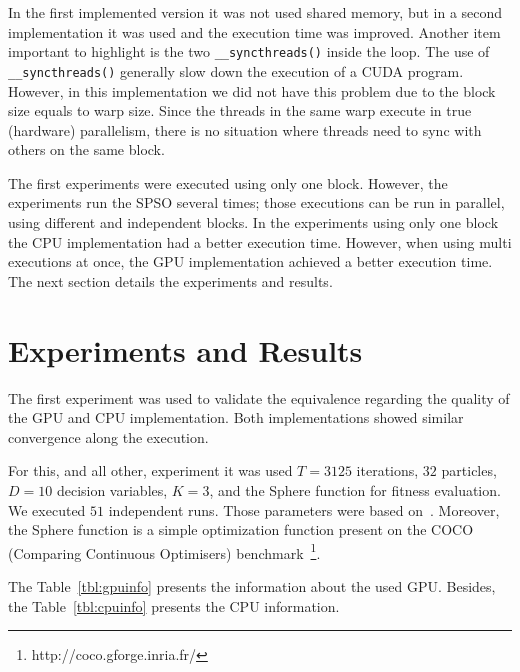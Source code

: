 \documentclass{article}
\begin{document}
    In the first implemented version it was not used shared memory, but in a second implementation it was used and the execution time was improved.
    Another item important to highlight is the two \texttt{\_\_syncthreads()} inside the loop.
    The use of \texttt{\_\_syncthreads()} generally slow down the execution of a CUDA program.
    However, in this implementation we did not have this problem due to the block size equals to warp size.
    Since the threads in the same warp execute in true (hardware) parallelism, there is no situation where threads need to sync with others on the same block.

    The first experiments were executed using only one block. However, the experiments run the SPSO several times; those executions can be run in parallel, using different and independent blocks. In the experiments using only one block the CPU implementation had a better execution time. However, when using multi executions at once, the GPU implementation achieved a better execution time.
    The next section details the experiments and results.

    \section{Experiments and Results}

    The first experiment was used to validate the equivalence regarding the quality of the GPU and CPU implementation. Both implementations showed similar convergence along the execution.

    For this, and all other, experiment it was used $T=3125$ iterations, $32$ particles, $D=10$ decision variables, $K=3$, and the Sphere function for fitness evaluation.  We executed $51$ independent runs. Those parameters were based on~\cite{SPSOCEC}. Moreover, the Sphere function is a simple optimization function present on the COCO (Comparing Continuous Optimisers) benchmark~\footnote{http://coco.gforge.inria.fr/}.

    The Table~\ref{tbl:gpuinfo} presents the information about the used GPU.
    Besides, the Table~\ref{tbl:cpuinfo} presents the CPU information.
\end{document}
